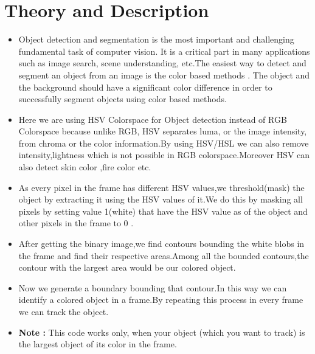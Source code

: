 \documentclass[11pt,a4paper]{article}
\begin{document}
	\section{Theory and Description}
	\begin{itemize}
		\item Object detection and segmentation is the most important and challenging fundamental task of computer vision.  It is a critical part in many applications such as image search, scene understanding, etc.The easiest way to detect and segment an object from an image is the color based methods . The object and the background should have a significant color difference in order to successfully  segment objects using color based methods.
		\item Here we are using HSV Colorspace for Object detection instead of RGB Colorspace because unlike RGB, HSV separates luma, or the image intensity, from chroma or the color information.By using HSV/HSL we can also remove intensity,lightness which is not possible in RGB colorspace.Moreover HSV can also detect skin color ,fire color etc. 
		\item  As every pixel in the frame has different HSV values,we threshold(mask) the object by extracting it using the HSV values of it.We do this by masking all pixels by setting value 1(white) that have the HSV value as of the object and other pixels in the frame to 0 .
		\item After getting the binary image,we find contours bounding the white blobs in the frame and find their respective areas.Among all the bounded contours,the contour with the largest area would be our colored object.
		\item Now we generate a boundary bounding that contour.In this way we can identify a colored object in a frame.By repeating this process in every frame we can track the object.		
		\item \textbf{Note :} This code works only, when your object (which you want to track) is the largest object of its color in the frame.
	\end{itemize}
\end{document}

